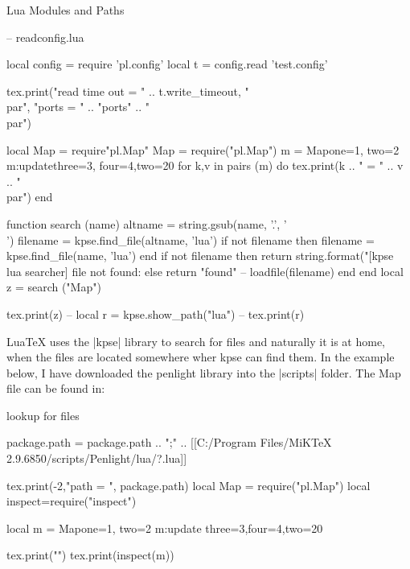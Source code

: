 \begin{texexample}{Lua Modules and Paths}{}

\begin{luacode}
  -- readconfig.lua
  
local config       = require 'pl.config'
local t               = config.read 'test.config'

tex.print("read time out = " .. t.write_timeout, "\\par",
            "ports = " .. "ports" .. "\\par")

 local Map = require"pl.Map"
 Map = require("pl.Map")
   m = Map{one=1, two=2}
   m:update{three=3, four=4,two=20}
   for k,v in pairs (m) do
       tex.print(k .. " = " .. v .. "\\par")
   end 
   
 function search (name)
    altname = string.gsub(name, '.', '\\')
    filename = kpse.find_file(altname, 'lua')	
    if not filename then
      filename = kpse.find_file(name, 'lua')
    end
    if not filename then
      return string.format("[kpse lua searcher] file not found: %
    else
      return "found" -- loadfile(filename)
    end
end
local z = search ("Map")

tex.print(z)
-- local r = kpse.show_path("lua")
-- tex.print(r)
\end{luacode}
\end{texexample}


LuaTeX uses the |kpse| library to search for files and naturally it is at home, when the files are located somewhere wher kpse can find them. In the example below, I have downloaded the penlight library into the |scripts| folder. The Map file can be found in:



\begin{texexample}{lookup for files}{}
\begin{luacode}
package.path = package.path .. ";" 
    .. [[C:/Program Files/MiKTeX 2.9.6850/scripts/Penlight/lua/?.lua]]

tex.print(-2,"path = ", package.path)
local Map = require("pl.Map")
local inspect=require("inspect")

local m = Map{one=1, two=2}
m:update {three=3,four=4,two=20}

tex.print("")
tex.print(inspect(m))
\end{luacode}
\end{texexample}

